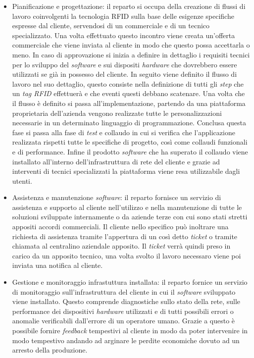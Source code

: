 \begin{itemize}
    \item Pianificazione e progettazione: il reparto si occupa della creazione di flussi di lavoro coinvolgenti la tecnologia RFID sulla base delle esigenze
    specifiche espresse dal cliente, servendosi di un commerciale e di un tecnico specializzato. Una volta effettuato questo incontro viene creata un'offerta
    commerciale che viene inviata al cliente in modo che questo possa accettarla o meno. In caso di approvazione si inizia a definire in dettaglio
    i requisiti tecnici per lo sviluppo del \emph{software} e sui dispositi \emph{hardware} che dovrebbero essere utilizzati se già in possesso del cliente.
    In seguito viene definito il flusso di lavoro nel suo dettaglio, questo consiste nella definizione di tutti gli \emph{step} che un \emph{tag RFID} 
    effettuerà e che eventi questi debbano scatenare. Una volta che il flusso è definito si passa all'implementazione, partendo da una piattaforma proprietaria dell'azienda 
    vengono realizzate tutte le personalizzazioni necessarie in un determinato linguaggio di programmazione.
    Conclusa questa fase si passa alla fase di \emph{test} e collaudo in cui si verifica che l’applicazione realizzata rispetti tutte le specifiche 
    di progetto, così come collaudi funzionali e di performance.
    Infine il prodotto \emph{software} che ha superato il collaudo viene installato all'interno dell'infrastruttura di rete del cliente e grazie ad interventi
    di tecnici specializzati la piattaforma viene resa utilizzabile dagli utenti.
    \item Assistenza e manutenzione \emph{software}: il reparto fornisce un servizio di assistenza e supporto al cliente nell'utilizzo e nella manutenzione 
    di tutte le soluzioni sviluppate internamente o da aziende terze con cui sono stati stretti appositi accordi commerciali. Il cliente nello specifico può
    inoltrare una richiesta di assistenza tramite l'appertura di un così detto \emph{ticket} o tramite chiamata al centralino aziendale apposito.
    Il \emph{ticket} verrà quindi preso in carico da un apposito tecnico, una volta svolto il lavoro necessaro viene poi inviata una notifica al cliente. 
    \item Gestione e monitoraggio infrastuttura installata: il reparto fornice un servizio di monitoraggio sull'infrastruttura del cliente in cui il
    \emph{software} sviluppato viene installato. Questo comprende diagnostiche sullo stato della rete, sulle performance dei dispositivi \emph{hardware}
    utilizzati e di tutti possibili errori o anomalie verificabili dall'errore di un operatore umano. Grazie a questo è possibile fornire \emph{feedback}
    tempestivi al cliente in modo da poter intervenire in modo tempestivo andando ad arginare le perdite economiche dovuto ad un arresto della produzione.
\end{itemize} 

